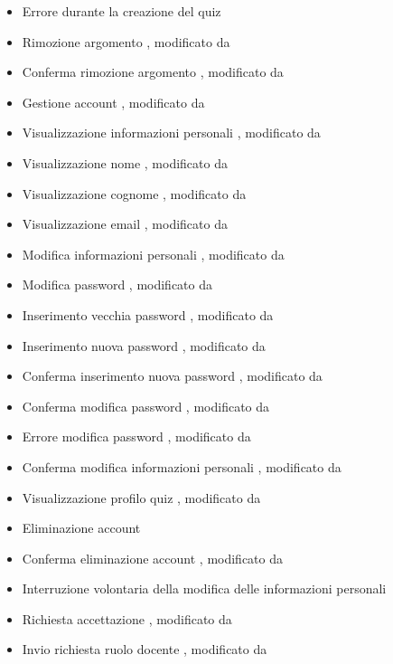 \begin{itemize}
	\item {} Errore durante la creazione del quiz
	\item {} Rimozione argomento , modificato da 
	\item {} Conferma rimozione argomento , modificato da 
	\item {} Gestione account , modificato da 
	\item {} Visualizzazione informazioni personali , modificato da 
	\item {} Visualizzazione nome , modificato da 
	\item {} Visualizzazione cognome , modificato da 
	\item {} Visualizzazione email , modificato da 
	\item {} Modifica informazioni personali , modificato da 
	\item {} Modifica password , modificato da 
	\item {} Inserimento vecchia password , modificato da 
	\item {} Inserimento nuova password , modificato da 
	\item {} Conferma inserimento nuova password , modificato da 
	\item {} Conferma modifica password , modificato da 
	\item {} Errore modifica password , modificato da 
	\item {} Conferma modifica informazioni personali , modificato da 
	\item {} Visualizzazione profilo quiz , modificato da 
	\item {} Eliminazione account 
	\item {} Conferma eliminazione account , modificato da 
	\item {} Interruzione volontaria della modifica delle informazioni personali
	\item {} Richiesta accettazione , modificato da 
	\item {} Invio richiesta ruolo docente , modificato da 

\end{itemize}
